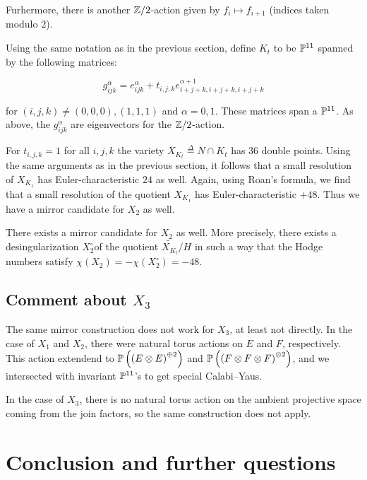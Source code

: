 Furhermore, there is another $\Z/2$-action given by $f_i \mapsto f_{i+1}$ (indices taken modulo $2$).

Using the same notation as in the previous section, define $K_t$ to be $\P^{11}$ 
spanned by the following matrices:

\begin{equation}
\label{eq:gijk}
g_{ijk}^\alpha = e_{ijk}^\alpha + t_{i,j,k} e_{i+j+k,i+j+k,i+j+k}^{\alpha+1}
\end{equation}

for $(i,j,k)\neq (0,0,0),(1,1,1)$ and $\alpha=0,1$. These matrices span a $\P^{11}$. As above, the $g_{ijk}^\alpha$ are eigenvectors for the $\Z/2$-action.

For $t_{i,j,k}=1$ for all $i,j,k$ the variety $X_{K_t} \stackrel \Delta =  N \cap K_t$ has $36$ double points. Using the same arguments as in the previous section, it follows that a small resolution of $X_{K_1}$ has Euler-characteristic $24$ as well. Again, using Roan's formula, we find that a small resolution of the quotient $X_{K_1}$ has Euler-characteristic $+48$. Thus we have a mirror candidate for $X_2$ as well.

\begin{proposition}
There exists a mirror candidate for $X_2$ as well. More precisely, there exists a \CY desingularization $X_2^\circ $of the quotient $\widetilde {X_{K_t}}/H$ in such a way that the Hodge numbers satisfy $\chi(X_2) = -\chi(X_2^\circ) = -48$.
\end{proposition}

\subsection{Comment about $X_3$}

The same mirror construction does not work for $X_3$, at least not directly. In the case of $X_1$ and $X_2$, there were natural torus actions on $E$ and $F$,  respectively. This action extendend to $\P\left(\left( E \otimes E\right)^{\oplus 2}\right)$ and $\P\left(\left(F \otimes F \otimes F\right)^{\otimes 2}\right)$, and we intersected with invariant $\P^{11}$'s to get special Calabi--Yaus.

In the case of $X_3$, there is no natural torus action on the ambient projective space coming from the join factors, so the same construction does not apply.

\section{Conclusion and further questions}

